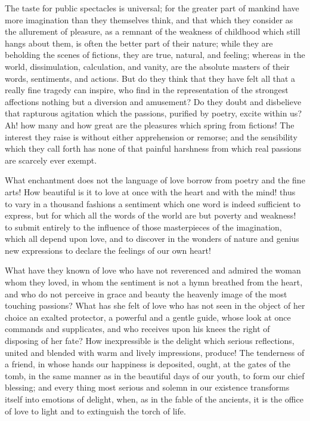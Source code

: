 The taste for public spectacles is universal; for the greater part of
mankind have more imagination than they themselves think, and that
which they consider as the allurement of pleasure, as a remnant of the
weakness of childhood which still hangs about them, is often the
better part of their nature; while they are beholding the scenes of
fictions, they are true, natural, and feeling; whereas in the world,
dissimulation, calculation, and vanity, are the absolute masters of
their words, sentiments, and actions. But do they think that they have
felt all that a really fine tragedy can inspire, who find in the
representation of the strongest affections nothing but a diversion and
amusement? Do they doubt and disbelieve that rapturous agitation which
the passions, purified by poetry, excite within us? Ah! how many and
how great are the pleasures which spring from fictions! The interest
they raise is without either apprehension or remorse; and the
sensibility which they call forth has none of that painful harshness
from which real passions are scarcely ever exempt.

What enchantment does not the language of love borrow from poetry and
the fine arts! How beautiful is it to love at  once with the
heart and with the mind! thus to vary in a thousand fashions a
sentiment which one word is indeed sufficient to express, but for
which all the words of the world are but poverty and weakness! to
submit entirely to the influence of those masterpieces of the
imagination, which all depend upon love, and to discover in the
wonders of nature and genius new expressions to declare the feelings
of our own heart!

What have they known of love who have not reverenced and admired the
woman whom they loved, in whom the sentiment is not a hymn breathed
from the heart, and who do not perceive in grace and beauty the
heavenly image of the most touching passions? What has she felt of
love who has not seen in the object of her choice an exalted
protector, a powerful and a gentle guide, whose look at once commands
and supplicates, and who receives upon his knees the right of
disposing of her fate? How inexpressible is the delight which serious
reflections, united and blended with warm and lively impressions,
produce! The tenderness of a friend, in whose hands our happiness is
deposited, ought, at the gates of the tomb, in the same manner as in
the beautiful days of our youth, to form our chief blessing; and every
thing most serious and solemn in our existence transforms itself into
emotions of delight, when, as in the fable of the ancients, it is the
office of love to light and to extinguish the torch of life.


